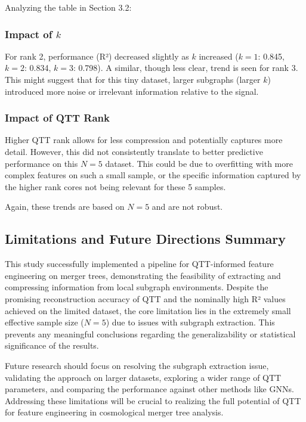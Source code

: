 \documentclass[twocolumn]{aastex631}
\begin{document}
Analyzing the table in Section 3.2:

\subsubsection{Impact of $k$}
For rank 2, performance (R²) decreased slightly as $k$ increased ($k=1$: 0.845, $k=2$: 0.834, $k=3$: 0.798). A similar, though less clear, trend is seen for rank 3. This might suggest that for this tiny dataset, larger subgraphs (larger $k$) introduced more noise or irrelevant information relative to the signal.

\subsubsection{Impact of QTT Rank}
Higher QTT rank allows for less compression and potentially captures more detail. However, this did not consistently translate to better predictive performance on this $N=5$ dataset. This could be due to overfitting with more complex features on such a small sample, or the specific information captured by the higher rank cores not being relevant for these 5 samples.

Again, these trends are based on $N=5$ and are not robust.

\subsection{Limitations and Future Directions Summary}

This study successfully implemented a pipeline for QTT-informed feature engineering on merger trees, demonstrating the feasibility of extracting and compressing information from local subgraph environments. Despite the promising reconstruction accuracy of QTT and the nominally high R² values achieved on the limited dataset, the core limitation lies in the extremely small effective sample size ($N=5$) due to issues with subgraph extraction. This prevents any meaningful conclusions regarding the generalizability or statistical significance of the results.

Future research should focus on resolving the subgraph extraction issue, validating the approach on larger datasets, exploring a wider range of QTT parameters, and comparing the performance against other methods like GNNs. Addressing these limitations will be crucial to realizing the full potential of QTT for feature engineering in cosmological merger tree analysis.
\end{document}
